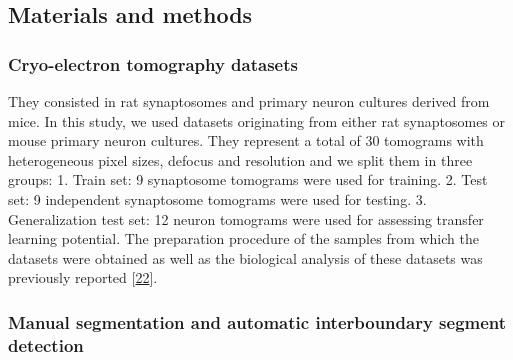 \hypertarget{materials-and-methods}{%
\subsection{Materials and methods}\label{materials-and-methods}}

\hypertarget{cryo-electron-tomography-datasets}{%
\subsubsection{Cryo-electron tomography datasets}\label{cryo-electron-tomography-datasets}}

They consisted in rat synaptosomes and primary neuron cultures derived from mice.
In this study, we used datasets originating from either rat synaptosomes or mouse primary neuron cultures.
They represent a total of 30 tomograms with heterogeneous pixel sizes, defocus and resolution and we split them in three groups:
1. Train set: 9 synaptosome tomograms were used for training.
2. Test set: 9 independent synaptosome tomograms were used for testing.
3. Generalization test set: 12 neuron tomograms were used for assessing transfer learning potential.
The preparation procedure of the samples from which the datasets were obtained as well as the biological analysis of these datasets was previously reported {[}\protect\hyperlink{ref-CERJ8H0p}{22}{]}.

\hypertarget{manual-segmentation-and-automatic-interboundary-segment-detection}{%
\subsubsection{Manual segmentation and automatic interboundary segment detection}\label{manual-segmentation-and-automatic-interboundary-segment-detection}}

